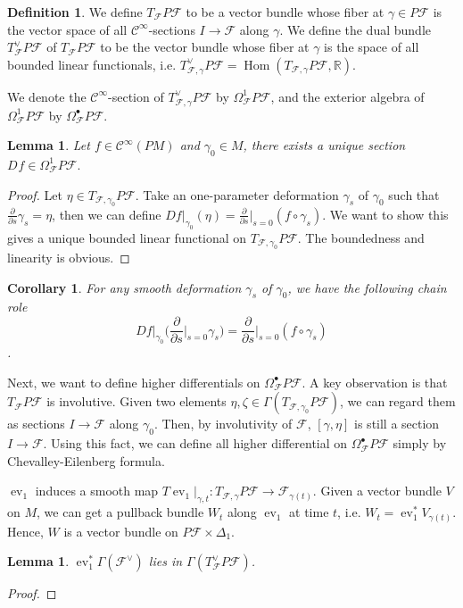 \documentclass[12pt]{amsart}
\newtheorem{cor}[thm]{Corollary}
\newtheorem{lem}[thm]{Lemma}
\theoremstyle{definition}
\newtheorem{defn}[thm]{Definition}
\theoremstyle{remark}
\numberwithin{equation}{section}
\newcommand{\del}{\partial}
\renewcommand{\del}{\partial}
\newcommand{\CF}{{\mathcal F}}
\newcommand{\cinf}{{\mathcal C}^{\infty}}
\newcommand{\R}{{\mathbb{R}}}
\newcommand{\1}{{\mathbb{1}}}
\newcommand{\Hom}{\operatorname{Hom}}
\newcommand{\ev}{\operatorname{ev}}
\begin{document}
\begin{defn}
	We define  $T_{\CF}P\CF$ to be a vector bundle whose fiber at $\gamma \in P\CF$ is the vector space of all $\cinf$-sections $I\to \CF$ along $\gamma$. We define the dual bundle $T^{\vee}_{\CF} P \CF$ of  $T_{\CF}P\CF$ to be the vector bundle whose fiber at $\gamma$ is the space of all bounded linear functionals, i.e. $T^{\vee}_{\CF, \gamma} P\CF = \Hom(T^{}_{\CF, \gamma} P\CF, \R)$.  
\end{defn}
We denote the $\cinf$-section of $T^{\vee}_{\CF, \gamma} P\CF$ by $\Omega_{\CF}^1 P\CF$, and the exterior algebra of $\Omega_{\CF}^1 P\CF$ by $\Omega_{\CF}^{\bullet} P\CF$.



\begin{lem}
	Let $f\in \cinf(PM)$ and $\gamma_0 \in M$, there exists a unique section $D_{} f \in \Omega_{\CF}^1 P\CF.$
\end{lem}
\begin{proof}Let $\eta \in T_{\CF, \gamma_0}P\CF$. Take an one-parameter deformation $\gamma_s$ of $\gamma_0$ such that $\frac{\del}{\del s} \gamma_s = \eta$, then we can define $Df\big|_{\gamma_0} (\eta)= \frac{\del}{\del s}\big|_{s=0}(f\circ \gamma_s)$. We want to show this gives a unique bounded linear functional on $T_{\CF, \gamma_0} P\CF$. The boundedness and linearity is obvious.  
	\end{proof}
\begin{cor}
	For any smooth deformation $\gamma_s$ of $\gamma_0$, we have the following chain role
	$$
	Df\big|_{\gamma_0} \big(\frac{\del}{\del s}\bigg|_{s = 0} \gamma_s\big) = \frac{\del}{\del s}\bigg|_{s = 0} (f\circ\gamma_s)
	$$.
\end{cor}

Next, we want to define higher differentials on $\Omega_{\CF}^{\bullet} P\CF$. A key observation is that $T_{\CF}P\CF$ is involutive. Given two elements $\eta, \zeta \in \Gamma(T_{\CF, \gamma_0}P\CF)$, we can regard them as sections $I \to \CF$ along $\gamma_0$. Then, by involutivity of $\CF$, $[\gamma, \eta]$ is still a section $I\to \CF$. Using this fact, we can define all higher differential on $\Omega_{\CF}^{\bullet} P\CF$ simply by Chevalley-Eilenberg formula.



$\ev_1$ induces a smooth map $T\ev_1\big|_{\gamma,t}:T_{\CF, \gamma}P\CF \to \CF_{\gamma(t)}$. Given a vector bundle $V$ on $M$, we can get a pullback bundle $W_t$ along $\ev_1$ at time $t$, i.e. $W_t = \ev_{1}^* V_{\gamma(t)}$. Hence, $W$ is a vector bundle on $P\CF \times \Delta_1$.
\begin{lem}
	$\ev_1^* \Gamma (\CF^{\vee})$ lies in $\Gamma(T^{\vee}_{\CF} P\CF)$.
\end{lem}
\begin{proof}
	\end{proof}
\end{document}
